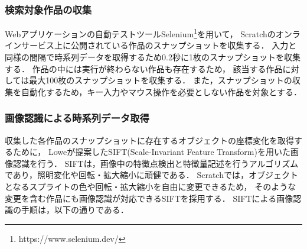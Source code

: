 \documentclass[11pt]{jreport}
\begin{document}
\subsubsection{検索対象作品の収集}
\label{collection}
Webアプリケーションの自動テストツールSelenium\footnote{https://www.selenium.dev/}を用いて，
Scratchのオンラインサービス上に公開されている作品のスナップショットを収集する．
入力と同様の間隔で時系列データを取得するため0.2秒に1枚のスナップショットを収集する．
作品の中には実行が終わらない作品も存在するため，
該当する作品に対しては最大100枚のスナップショットを収集する．
また，スナップショットの収集を自動化するため，キー入力やマウス操作を必要としない作品を対象とする．

\subsubsection{画像認識による時系列データ取得}
収集した各作品のスナップショットに存在するオブジェクトの座標変化を取得するために，
Loweが提案したSIFT(Scale-Invariant Feature Transform)\cite{sift}を用いた画像認識を行う．
SIFTは，画像中の特徴点検出と特徴量記述を行うアルゴリズムであり，照明変化や回転・拡大縮小に頑健である．
Scratchでは，オブジェクトとなるスプライトの色や回転・拡大縮小を自由に変更できるため，
そのような変更を含む作品にも画像認識が対応できるSIFTを採用する．
SIFTによる画像認識の手順は，以下の通りである．
\end{document}

